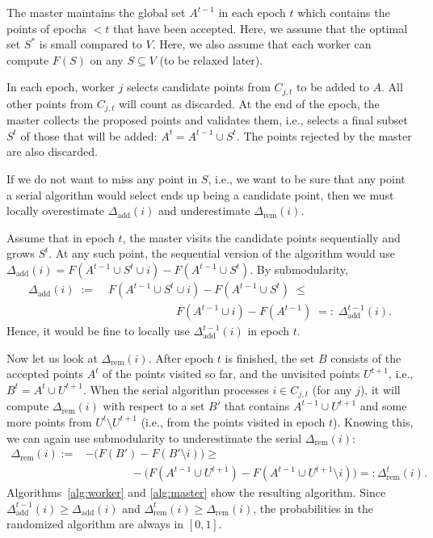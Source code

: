 \documentclass{article}
\newcommand{\union}{\cup}
\begin{document}
The master maintains the global set $A^{t-1}$ in each epoch $t$ which contains the points of epochs $<t$ that have been accepted. Here, we assume that the optimal set $S^*$ is small compared to $V$. Here, we also assume that each worker can compute $F(S)$ on any $S \subseteq V$ (to be relaxed later).

In each epoch, worker $j$ selects candidate points from $C_{j,t}$ to be added to $A$. All other points from $C_{j,t}$ will count as discarded. At the end of the epoch, the master collects the proposed points and validates them, i.e., selects a final subset $S^t$ of those that will be added: $A^t = A^{t-1} \union S^t$. The points rejected by the master are also discarded. 

If we do not want to miss any point in $S$, i.e., we want to be sure that any point a serial algorithm would select ends up being a candidate point, then we must locally overestimate $\Delta_{\text{add}}(i)$ and underestimate $\Delta_{\text{rem}}(i)$. 

Assume that in epoch $t$, the master visits the candidate points sequentially and grows $S^t$. At any such point, the sequential version of the algorithm would use $\Delta_{\text{add}}(i) =  F(A^{t-1} \union S^t \union i) - F(A^{t-1} \union S^t)$.
By submodularity,
\begin{align}
  \nonumber
  \Delta_{\text{add}}(i)\; :=\; &F(A^{t-1} \union S^t \union i) - F(A^{t-1} \union S^t)\; \leq\\
  &\qquad\qquad\qquad F(A^{t-1} \union i) - F(A^{t-1})\; =:\; \Delta_{\text{add}}^{t-1}(i).
\end{align}
Hence, it would be fine to locally use $\Delta^{t-1}_{\text{add}}(i)$ in epoch $t$.

Now let us look at $\Delta_{\text{rem}}(i)$.
After epoch $t$ is finished, the set $B$ consists of the accepted points $A^t$ of the points visited so far, and the unvisited points $U^{t+1}$, i.e., $B^t = A^t \union U^{t+1}$. When the serial algorithm processes $i \in C_{j,t}$ (for any $j$), it will compute $\Delta_{\text{rem}}(i)$ with respect to a set $B'$ that contains $A^{t-1} \union U^{t+1}$ and some more points from $U^t \setminus U^{t+1}$ (i.e., from the points visited in epoch $t$). Knowing this, we can again use submodularity to underestimate the serial $\Delta_{\text{rem}}(i)$:
%
\begin{align}
  \label{eq:1}
  \nonumber
  \Delta_{\text{rem}}(i) := &-\big(F(B') - F(B'\setminus i)\big) \geq\\
  &\qquad\qquad -\big(F(A^{t-1}\union U^{t+1}) - F(A^{t-1} \union U^{t+1} \setminus i)\big) =: \Delta^{t}_{\text{rem}}(i).
\end{align}
Algorithms~\ref{alg:worker} and \ref{alg:master} show the resulting algorithm. Since $\Delta_{\text{add}}^{t-1}(i) \geq \Delta_{\text{add}}(i)$ and $\Delta_{\text{rem}}^{t}(i) \geq \Delta_{\text{rem}}(i)$, the probabilities in the randomized algorithm are always in $[0,1]$.
\end{document}
